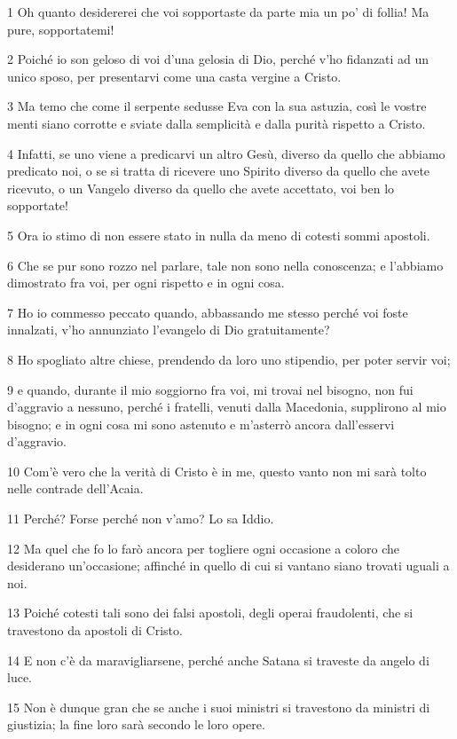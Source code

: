 \par 1 Oh quanto desidererei che voi sopportaste da parte mia un po' di follia! Ma pure, sopportatemi!
\par 2 Poiché io son geloso di voi d'una gelosia di Dio, perché v'ho fidanzati ad un unico sposo, per presentarvi come una casta vergine a Cristo.
\par 3 Ma temo che come il serpente sedusse Eva con la sua astuzia, così le vostre menti siano corrotte e sviate dalla semplicità e dalla purità rispetto a Cristo.
\par 4 Infatti, se uno viene a predicarvi un altro Gesù, diverso da quello che abbiamo predicato noi, o se si tratta di ricevere uno Spirito diverso da quello che avete ricevuto, o un Vangelo diverso da quello che avete accettato, voi ben lo sopportate!
\par 5 Ora io stimo di non essere stato in nulla da meno di cotesti sommi apostoli.
\par 6 Che se pur sono rozzo nel parlare, tale non sono nella conoscenza; e l'abbiamo dimostrato fra voi, per ogni rispetto e in ogni cosa.
\par 7 Ho io commesso peccato quando, abbassando me stesso perché voi foste innalzati, v'ho annunziato l'evangelo di Dio gratuitamente?
\par 8 Ho spogliato altre chiese, prendendo da loro uno stipendio, per poter servir voi;
\par 9 e quando, durante il mio soggiorno fra voi, mi trovai nel bisogno, non fui d'aggravio a nessuno, perché i fratelli, venuti dalla Macedonia, supplirono al mio bisogno; e in ogni cosa mi sono astenuto e m'asterrò ancora dall'esservi d'aggravio.
\par 10 Com'è vero che la verità di Cristo è in me, questo vanto non mi sarà tolto nelle contrade dell'Acaia.
\par 11 Perché? Forse perché non v'amo? Lo sa Iddio.
\par 12 Ma quel che fo lo farò ancora per togliere ogni occasione a coloro che desiderano un'occasione; affinché in quello di cui si vantano siano trovati uguali a noi.
\par 13 Poiché cotesti tali sono dei falsi apostoli, degli operai fraudolenti, che si travestono da apostoli di Cristo.
\par 14 E non c'è da maravigliarsene, perché anche Satana si traveste da angelo di luce.
\par 15 Non è dunque gran che se anche i suoi ministri si travestono da ministri di giustizia; la fine loro sarà secondo le loro opere.
